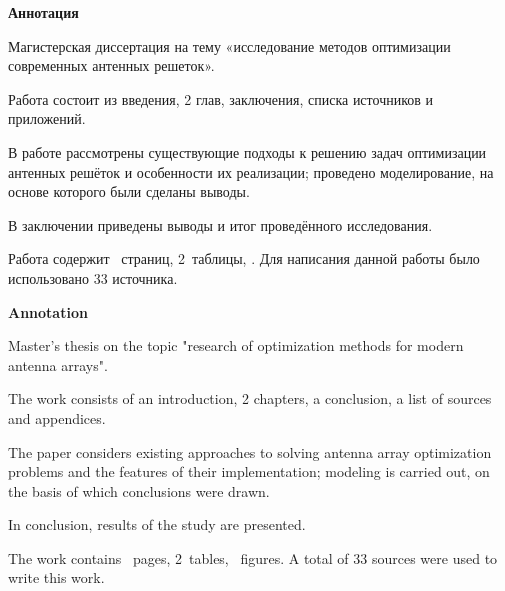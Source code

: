 {\Large\normalfont\bfseries \hfil Аннотация}
\vspace{1em}
\thispagestyle{empty}

Магистерская диссертация на тему «исследование методов оптимизации современных антенных решеток».

Работа состоит из введения, 2 глав, заключения, списка источников и приложений.

В работе рассмотрены существующие подходы к решению задач оптимизации антенных решёток и 
особенности их реализации; проведено моделирование, на основе которого были сделаны выводы.

В заключении приведены выводы и итог проведённого исследования.

Работа содержит~\pageref*{LastPage} страниц, 2~таблицы, \printtotfig.
Для написания данной работы было использовано 33 источника. 


{\Large\normalfont\bfseries \hfil Annotation}
\vspace{1em}
\thispagestyle{empty}

Master's thesis on the topic "research of optimization methods for modern antenna arrays".

The work consists of an introduction, 2 chapters, a conclusion, a list of sources and appendices.

The paper considers existing approaches to solving antenna array optimization problems and the features of
their implementation; modeling is carried out, on the basis of which conclusions were drawn.

In conclusion, results of the study are presented.

The work contains~\pageref*{LastPage} pages, 2~tables, \totalfigures~figures. 
A total of 33 sources were used to write this work.
